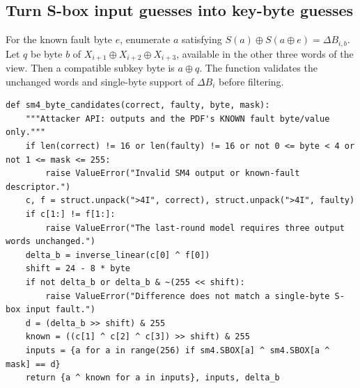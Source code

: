 \documentclass[11pt,a4paper]{report}
\newcommand{\xor}{\mathbin{\oplus}}
\begin{document}
\subsection{Turn S-box input guesses into key-byte guesses}
For the known fault byte $e$, enumerate $a$ satisfying $S(a)\xor S(a\xor e)=\Delta B_{i,b}$. Let $q$ be byte $b$ of $X_{i+1}\xor X_{i+2}\xor X_{i+3}$, available in the other three words of the view. Then a compatible subkey byte is $a\xor q$. The function validates the unchanged words and single-byte support of $\Delta B_i$ before filtering.
\begin{lstlisting}[style=pycode,caption={Known-byte SM4 differential filtering}]
def sm4_byte_candidates(correct, faulty, byte, mask):
    """Attacker API: outputs and the PDF's KNOWN fault byte/value only."""
    if len(correct) != 16 or len(faulty) != 16 or not 0 <= byte < 4 or not 1 <= mask <= 255:
        raise ValueError("Invalid SM4 output or known-fault descriptor.")
    c, f = struct.unpack(">4I", correct), struct.unpack(">4I", faulty)
    if c[1:] != f[1:]:
        raise ValueError("The last-round model requires three output words unchanged.")
    delta_b = inverse_linear(c[0] ^ f[0])
    shift = 24 - 8 * byte
    if not delta_b or delta_b & ~(255 << shift):
        raise ValueError("Difference does not match a single-byte S-box input fault.")
    d = (delta_b >> shift) & 255
    known = ((c[1] ^ c[2] ^ c[3]) >> shift) & 255
    inputs = {a for a in range(256) if sm4.SBOX[a] ^ sm4.SBOX[a ^ mask] == d}
    return {a ^ known for a in inputs}, inputs, delta_b
\end{lstlisting}
\end{document}
